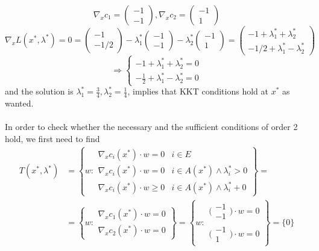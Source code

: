 \documentclass{article}
\begin{document}
\[\nabla_x c_1= \begin{pmatrix}-1 \\ -1\end{pmatrix}, \nabla_x c_2 = \begin{pmatrix}-1 \\ 1\end{pmatrix}\]
\[\nabla_x L(x^*, \lambda^*) = 0 = \begin{pmatrix}-1\\ -1/2\end{pmatrix}- \lambda^*_1 \begin{pmatrix}-1\\ -1\end{pmatrix}-\lambda^*_2 \begin{pmatrix}-1\\ 1\end{pmatrix}=\begin{pmatrix}-1+\lambda^*_1 +\lambda^*_2 \\ -1/2+\lambda^*_1-\lambda^*_2\end{pmatrix}\]
\[\Rightarrow \begin{cases}-1+\lambda^*_1 +\lambda^*_2=0 \\ -\frac{1}{2}+\lambda^*_1-\lambda^*_2=0 \end{cases}\]
and the solution is $\lambda^*_1 =\frac{3}{4}, \lambda^*_2 = \frac{1}{4}$, implies that KKT conditions hold at $x^*$ as wanted.\\ \\
In order to check whether the necessary and the sufficient conditions of order 2 hold, we first need to find
\begin{align*}
    T(x^*, \lambda^*) &= \left\{w:\begin{array}{lr}\nabla_x c_i(x^*) \cdot w =0 & i\in E\\\nabla_x c_i(x^*) \cdot w =0 & i\in A(x^*)\wedge \lambda^*_i>0\\\nabla_x c_i(x^*) \cdot w \ge 0 & i\in A(x^*)\wedge \lambda^*_i+0\end{array} \right\} = \\ &= \left\{w:\begin{array}{lr}
    \nabla_x c_1(x^*) \cdot w =0 \\ \nabla_x c_2(x^*) \cdot w =0 \end{array}\right\}=\left\{w:\begin{array}{lr}\big(\begin{smallmatrix}-1 \\ -1\end{smallmatrix}\big) \cdot w =0 \\\big(\begin{smallmatrix}-1 \\ 1\end{smallmatrix}\big) \cdot w =0 \end{array}\right\}=\{0\}   
\end{align*}
\end{document}
